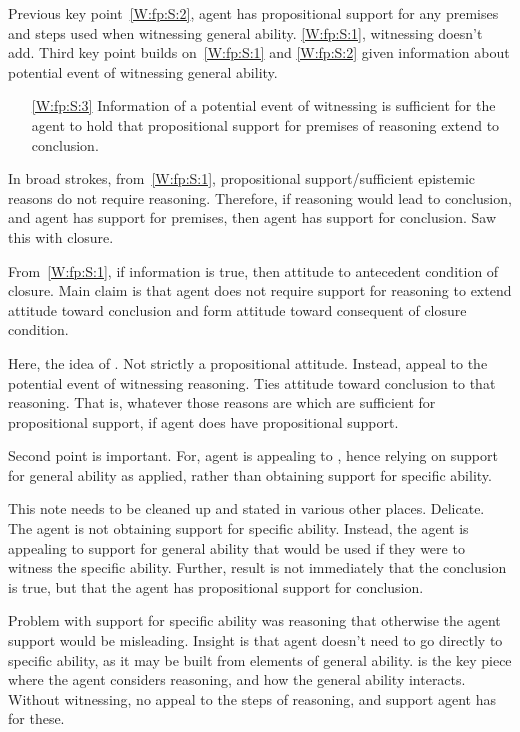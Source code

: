 \begin{note}
  Previous key point~\ref{W:fp:S:2}, agent has propositional support for any premises and steps used when witnessing general ability.
  \ref{W:fp:S:1}, witnessing doesn't add.
  Third key point builds on~\ref{W:fp:S:1} and \ref{W:fp:S:2} given information about potential event of witnessing general ability.
  \begin{enumerate}
  \item[\ref{W:fp:S:3}] Information of a potential event of witnessing is sufficient for the agent to hold that propositional support for premises of reasoning extend to conclusion.
  \end{enumerate}

  In broad strokes, from~\ref{W:fp:S:1}, propositional support/sufficient epistemic reasons do not require reasoning.
  Therefore, if reasoning would lead to conclusion, and agent has support for premises, then agent has support for conclusion.
  Saw this with closure.

  From~\ref{W:fp:S:1}, if information is true, then attitude to antecedent condition of closure.
  Main claim is that agent does not require support for reasoning to extend attitude toward conclusion and form attitude toward consequent of closure condition.

  Here, the idea of \WR{}.
  Not strictly a propositional attitude.
  Instead, appeal to the potential event of witnessing reasoning.
  Ties attitude toward conclusion to that reasoning.
  That is, whatever those reasons are which are sufficient for propositional support, if agent does have propositional support.

  Second point is important.
  For, agent is appealing to \WR{}, hence relying on support for general ability as applied, rather than obtaining support for specific ability.

  {
    \color{red}
    {\color{green} This note needs to be cleaned up and stated in various other places.}
    Delicate.
    The agent is not obtaining support for specific ability.
    Instead, the agent is appealing to support for general ability that would be used if they were to witness the specific ability.
    Further, result is not immediately that the conclusion is true, but that the agent has propositional support for conclusion.

    Problem with support for specific ability was reasoning that otherwise the agent support would be misleading.
    Insight is that agent doesn't need to go directly to specific ability, as it may be built from elements of general ability.
    \WR{} is the key piece where the agent considers reasoning, and how the general ability interacts.
    Without witnessing, no appeal to the steps of reasoning, and support agent has for these.
  }
\end{note}

